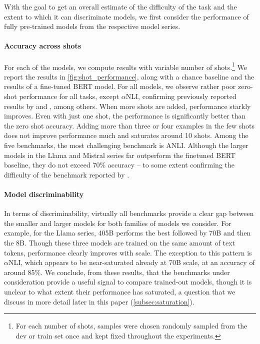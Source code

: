 With the goal to get an overall estimate of the difficulty of the task and the extent to which it can discriminate models, we first consider the performance of fully pre-trained models from the respective model series.

\paragraph{Accuracy across shots}
For each of the models, we compute results with variable number of shots.\footnote{For each number of shots, samples were chosen randomly sampled from the dev or train set once and kept fixed throughout the experiments.}
We report the results in \cref{fig:shot_performance}, along with a chance baseline and the results of a fine-tuned BERT model.
For all models, we observe rather poor zero-shot performance for all tasks, except $\alpha$NLI, confirming previously reported results by \citet{ohmer2024form} and \citet{weber-etal-2023-mind}, among others.
When more shots are added, performance starkly improves.
Even with just one shot, the performance is significantly better than the zero shot accuracy.
Adding more than three or four examples in the few shots does not improve performance much and saturates around 10 shots. 
Among the five benchmarks, the most challenging benchmark is ANLI.
Although the larger models in the Llama and Mistral series far outperform the finetuned BERT baseline, they do not exceed 70\% accuracy -- to some extent confirming the difficulty of the benchmark reported by \citet{brown2020language}.

\paragraph{Model discriminability}
In terms of discriminability, virtually all benchmarks provide a clear gap between the smaller and larger models for both families of models we consider.
For example, for the Llama series, 405B performs the best followed by 70B and then the 8B.
Though these three models are trained on the same amount of text tokens, performance clearly improves with scale.
The exception to this pattern is $\alpha$NLI, which appears to be near-saturated already at 70B scale, at an accuracy of around 85\%.
We conclude, from these results, that the benchmarks under consideration provide a useful signal to compare trained-out models, though it is unclear to what extent their performance has saturated, a question that we discuss in more detail later in this paper (\cref{subsec:saturation}).

